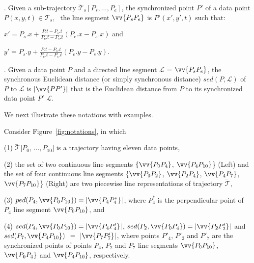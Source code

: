. Given a sub-trajectory $\dddot{\mathcal{T}}_s[P_s, \ldots, P_e]$, the synchronized point $P'$ of a data point  $P(x, y, t) \in \dddot{\mathcal{T}}_s$, ~\wrt the line segment $\vv{P_sP_e}$ is $P'(x', y', t)$ such that:

\ni $x' = P_s.x +  \frac{P.t-P_s.t}{P_e.t-P_s.t}(P_e.x - P_s.x)$ and

\ni $y' = P_s.y +  \frac{P.t-P_s.t}{P_e.t-P_s.t}(P_e.y - P_s.y)$.


. Given a data point $P$ and a directed line segment $\mathcal{L}$ = $\vv{P_{s}P_{e}}$, the synchronous Euclidean distance (or simply synchronous distance) $sed(P, \mathcal{L})$ of $P$ to $\mathcal{L}$ is $|\vv{PP'}|$ that is the Euclidean distance from $P$ to its synchronized data point $P'$ \wrt $\mathcal{L}$. %


We next illustrate these notations with examples.

\begin{example}
\label{exm-notations}
Consider Figure~\ref{fig:notations}, in which

\sstab(1) $\dddot{\mathcal{T}}[P_0$, $\ldots, P_{10}]$ is a trajectory having eleven data points,

\sstab (2) the set of two continuous line segments $\{\vv{P_0P_4}$, $\vv{P_4P_{10}}$\} (Left) and the set of four continuous line segments $\{\vv{P_0P_2}$, $\vv{P_2P_4}$, $\vv{P_4P_7}$, $\vv{P_7P_{10}}$\} (Right) are two piecewise line representations of trajectory $\dddot{\mathcal{T}}$,

\sstab(3) $ped(P_4, \vv{P_0P_{10}})=|\vv{P_4P^*_4}|$, where $P^*_4$ is the perpendicular point of $P_4$ \wrt line segment $\vv{P_0P_{10}}$, and

\sstab (4) $sed(P_4, \vv{P_0P_{10}})= |\vv{P_4P'_4}|$, $sed(P_2, \vv{P_0P_{4}})= |\vv{P_2P'_2}|$ and $sed(P_7, \vv{P_4P_{10}})$ $=$ $|\vv{P_7P'_7}|$,
where points $P'_4$, $P'_2$ and $P'_7$ are the synchronized points of points $P_4$, $P_2$ and $P_7$ \wrt line segments $\vv{P_0P_{10}}$, $\vv{P_0P_{4}}$ and $\vv{P_4P_{10}}$, respectively.
\end{example}

